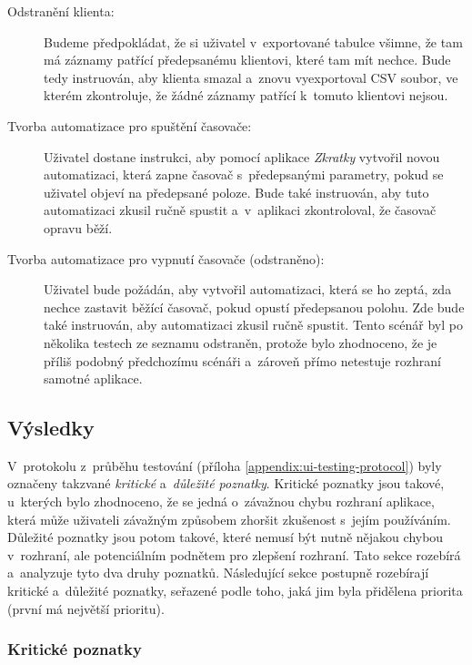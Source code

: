 \begin{description}
\item[Odstranění klienta:] Budeme předpokládat, že si uživatel v~exportované tabulce všimne, že tam má záznamy patřící předepsanému klientovi, které tam mít nechce. Bude tedy instruován, aby klienta smazal a~znovu vyexportoval CSV soubor, ve kterém zkontroluje, že žádné záznamy patřící k~tomuto klientovi nejsou.
\item[Tvorba automatizace pro spuštění časovače:] Uživatel dostane instrukci, aby pomocí aplikace \emph{Zkratky} vytvořil novou automatizaci, která zapne časovač s~předepsanými parametry, pokud se uživatel objeví na předepsané poloze. Bude také instruován, aby tuto automatizaci zkusil ručně spustit a~v~aplikaci zkontroloval, že časovač opravu běží.
\item[Tvorba automatizace pro vypnutí časovače (odstraněno):] Uživatel bude požádán, aby vytvořil automatizaci, která se ho zeptá, zda nechce zastavit běžící časovač, pokud opustí předepsanou polohu. Zde bude také instruován, aby automatizaci zkusil ručně spustit. Tento scénář byl po několika testech ze seznamu odstraněn, protože bylo zhodnoceno, že je příliš podobný předchozímu scénáři a~zároveň přímo netestuje rozhraní samotné aplikace.
\end{description}

\subsection{Výsledky}\label{ui-testing-results}

V~protokolu z~průběhu testování (příloha \ref{appendix:ui-testing-protocol}) byly označeny takzvané \emph{kritické} a~\emph{důležité poznatky}. Kritické poznatky jsou takové, u~kterých bylo zhodnoceno, že se jedná o~závažnou chybu rozhraní aplikace, která může uživateli závažným způsobem zhoršit zkušenost s~jejím používáním. Důležité poznatky jsou potom takové, které nemusí být nutně nějakou chybou v~rozhraní, ale potenciálním podnětem pro zlepšení rozhraní. Tato sekce rozebírá a~analyzuje tyto dva druhy poznatků. Následující sekce postupně rozebírají kritické a~důležité poznatky, seřazené podle toho, jaká jim byla přidělena priorita (první má největší prioritu).

\subsubsection{Kritické poznatky}

